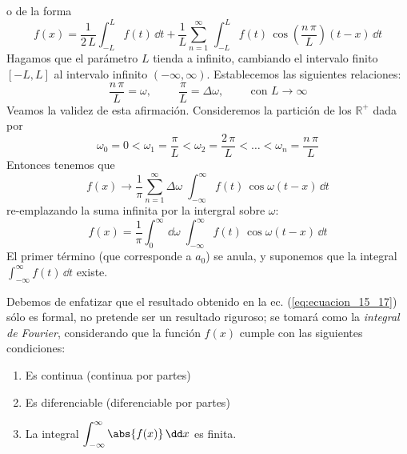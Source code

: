o de la forma
\begin{equation}
f(x) = \dfrac{1}{2 \, L} \int_{-L}^{L} f(t) \, \dd t + \dfrac{1}{L} \sum_{n=1}^{\infty} \, \int_{-L}^{L} f(t) \, \cos \left( \dfrac{n \, \pi}{L} \right) (t - x) \, \dd t
\label{eq:ecuacion_15_15}
\end{equation}
Hagamos que el parámetro $L$ tienda a infinito, cambiando el intervalo finito $[-L, L]$ al intervalo infinito $(-\infty, \infty)$. Establecemos las siguientes relaciones:
\[ \dfrac{n \, \pi}{L} = \omega, \hspace{1cm} \dfrac{\pi}{L} = \Delta \omega, \hspace{1cm} \mbox{con } L \to \infty \]
Veamos la validez de esta afirmación. Consideremos la partición de los $\mathbb{R}^{+}$ dada por
\begin{equation}
\omega_{0} = 0 < \omega_{1} = \dfrac{\pi}{L} < \omega_{2} = \dfrac{2 \, \pi}{L} < \ldots < \omega_{n} = \dfrac{n \, \pi}{L}
\label{eq:ecuacion_08_16}
\end{equation}
Entonces tenemos que
\begin{equation}
f(x) \rightarrow \dfrac{1}{\pi} \sum_{n=1}^{\infty} \Delta \omega \; \int_{-\infty}^{\infty} f(t) \, \cos \omega (t - x) \, \dd t
\label{eq:ecuacion_15_16}
\end{equation}
re-emplazando la suma infinita por la intergral sobre $\omega$:
\begin{equation}
f(x) = \dfrac{1}{\pi} \int_{0}^{\infty} \, \dd \omega \; \int_{-\infty}^{\infty} f(t) \, \cos \omega (t - x) \, \dd t
\label{eq:ecuacion_15_17}
\end{equation}
 El primer término (que corresponde a $a_{0}$) se anula, y suponemos que la integral $\displaystyle{\int_{-\infty}^{\infty} f(t) \, \dd t}$ existe.
\par
Debemos de enfatizar que el resultado obtenido en la ec. (\ref{eq:ecuacion_15_17}) sólo es formal, no pretende ser un resultado riguroso; se tomará como la \emph{integral de Fourier}, considerando que la función $f(x)$ cumple con las siguientes condiciones:
\begin{enumerate}
\item Es continua (continua por partes)
\item Es diferenciable (diferenciable por partes)
\item La integral $\displaystyle{\int_{-\infty}^{\infty} \abs{f(x)} \, \dd x}$ es finita. 
\end{enumerate}
